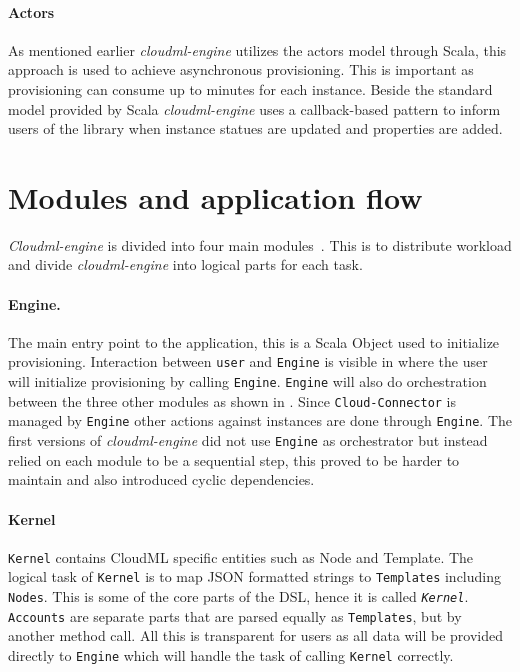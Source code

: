 \paragraph{Actors}
As mentioned earlier \emph{cloudml-engine} utilizes the actors model through Scala,
this approach is used to achieve asynchronous provisioning.
This is important as provisioning can consume up to minutes for each instance.
Beside the standard model provided by Scala \emph{cloudml-engine} uses
a callback-based pattern to inform users of the library when instance statues
are updated and properties are added.

\section{Modules and application flow}

\emph{Cloudml-engine} is divided into four main modules~.
This is to distribute workload and divide \emph{cloudml-engine} into logical parts for each task.

\paragraph{Engine.} The main entry point to the application, this is a Scala Object used to initialize
provisioning.
Interaction between \texttt{user} and \texttt{Engine} is visible in  
where the user will initialize provisioning by calling \texttt{Engine}.
\texttt{Engine} will also do orchestration between the three other modules
as shown in .
Since \texttt{Cloud-Connector} is managed by \texttt{Engine} other actions against 
instances are done through \texttt{Engine}.
The first versions of \emph{cloudml-engine} did not use \texttt{Engine} as orchestrator but
instead relied on each module to be a sequential step, this proved to be harder to maintain
and also introduced cyclic dependencies.

\paragraph{Kernel} \texttt{Kernel} contains CloudML specific entities such as Node and Template.
The logical task of \texttt{Kernel} is to map JSON formatted strings to \texttt{Templates} including \texttt{Nodes}.
This is some of the core parts of the DSL, hence it is called \emph{\texttt{Kernel}}.
\texttt{Accounts} are separate parts that are parsed equally as \texttt{Templates},
 but by another method call. All this is transparent for users as all data will
be provided directly to \texttt{Engine} which will handle the task
of calling \texttt{Kernel} correctly.

